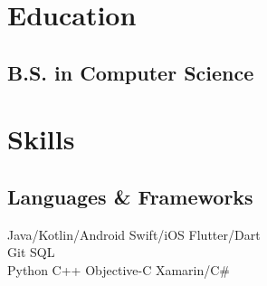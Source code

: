 \documentclass[]{Resume}
\begin{document}
%
%
\lastupdated

%
%

%
%

\begin{minipage}[t]{0.33\textwidth} 


\section{Education} 

\subsection{B.S. in Computer Science}
\sectionsep

\section{Skills}
\subsection{Languages \& Frameworks}
Java/Kotlin/Android \textbullet{}
Swift/iOS \textbullet{}
Flutter/Dart \\
Git \textbullet{}
SQL\\
Python \textbullet{}
C++ \textbullet{}
Objective-C \textbullet{} 
Xamarin/C\#
\sectionsep


\end{minipage}
\end{document}
